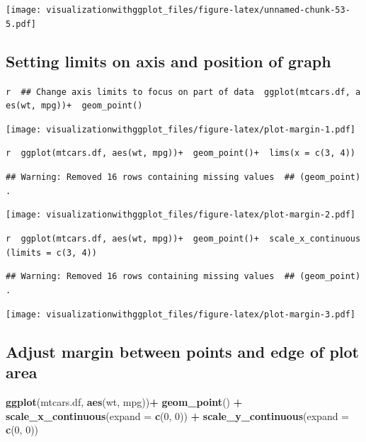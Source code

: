 \documentclass[]{krantz}
\makeatletter
\newenvironment{Shaded}{\begin{snugshade}}{\end{snugshade}}
\newcommand{\KeywordTok}[1]{\textcolor[rgb]{0.13,0.29,0.53}{\textbf{#1}}}
\newcommand{\DataTypeTok}[1]{\textcolor[rgb]{0.13,0.29,0.53}{#1}}
\newcommand{\DecValTok}[1]{\textcolor[rgb]{0.00,0.00,0.81}{#1}}
\newcommand{\StringTok}[1]{\textcolor[rgb]{0.31,0.60,0.02}{#1}}
\newcommand{\OperatorTok}[1]{\textcolor[rgb]{0.81,0.36,0.00}{\textbf{#1}}}
\newcommand{\NormalTok}[1]{#1}
\newenvironment{kframe}{%
\medskip{}
\setlength{\fboxsep}{.8em}
 \def\at@end@of@kframe{}%
 \ifinner\ifhmode%
  \def\at@end@of@kframe{\end{minipage}}%
  \begin{minipage}{\columnwidth}%
 \fi\fi%
 \def\FrameCommand##1{\hskip\@totalleftmargin \hskip-\fboxsep
 \colorbox{shadecolor}{##1}\hskip-\fboxsep
     \hskip-\linewidth \hskip-\@totalleftmargin \hskip\columnwidth}%
 \MakeFramed {\advance\hsize-\width
   \@totalleftmargin\z@ \linewidth\hsize
   \@setminipage}}%
 {\par\unskip\endMakeFramed%
 \at@end@of@kframe}
\renewenvironment{Shaded}{\begin{kframe}}{\end{kframe}}
\theoremstyle{definition}
\theoremstyle{definition}
\theoremstyle{definition}
\theoremstyle{remark}
\makeatother
\begin{document}
\texttt{[image: visualizationwithggplot\_files/figure-latex/unnamed-chunk-53-5.pdf]}

\subsection{Setting limits on axis and position of
graph}\label{setting-limits-on-axis-and-position-of-graph}

\texttt{r\ \ \#\#\ Change\ axis\ limits\ to\ focus\ on\ part\ of\ data\ \ ggplot(mtcars.df,\ aes(wt,\ mpg))+\ \ geom\_point()}

\texttt{[image: visualizationwithggplot\_files/figure-latex/plot-margin-1.pdf]}

\texttt{r\ \ ggplot(mtcars.df,\ aes(wt,\ mpg))+\ \ geom\_point()+\ \ lims(x\ =\ c(3,\ 4))}

\texttt{\#\#\ Warning:\ Removed\ 16\ rows\ containing\ missing\ values\ \ \#\#\ (geom\_point).}

\texttt{[image: visualizationwithggplot\_files/figure-latex/plot-margin-2.pdf]}

\texttt{r\ \ ggplot(mtcars.df,\ aes(wt,\ mpg))+\ \ geom\_point()+\ \ scale\_x\_continuous(limits\ =\ c(3,\ 4))}

\texttt{\#\#\ Warning:\ Removed\ 16\ rows\ containing\ missing\ values\ \ \#\#\ (geom\_point).}

\texttt{[image: visualizationwithggplot\_files/figure-latex/plot-margin-3.pdf]}

\subsection{Adjust margin between points and edge of plot
area}\label{adjust-margin-between-points-and-edge-of-plot-area}

\begin{Shaded}
\begin{Highlighting}[]
\KeywordTok{ggplot}\NormalTok{(mtcars.df, }\KeywordTok{aes}\NormalTok{(wt, mpg))}\OperatorTok{+}
\StringTok{ }\KeywordTok{geom_point}\NormalTok{() }\OperatorTok{+}
\StringTok{  }\KeywordTok{scale_x_continuous}\NormalTok{(}\DataTypeTok{expand =} \KeywordTok{c}\NormalTok{(}\DecValTok{0}\NormalTok{, }\DecValTok{0}\NormalTok{)) }\OperatorTok{+}
\StringTok{  }\KeywordTok{scale_y_continuous}\NormalTok{(}\DataTypeTok{expand =} \KeywordTok{c}\NormalTok{(}\DecValTok{0}\NormalTok{, }\DecValTok{0}\NormalTok{)) }
\end{Highlighting}
\end{Shaded}
\end{document}
